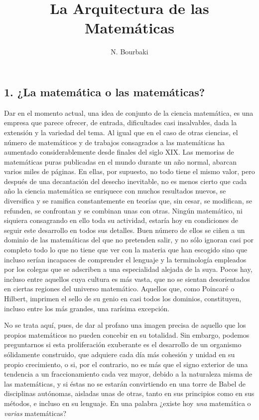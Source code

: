 \documentclass[a4paper, 12pt, draft]{article}
\title{La Arquitectura de las Matemáticas}
\author{N. Bourbaki}
\date{}
\begin{document}
\begin{tcolorbox}[colback=blue!5!white,colframe=blue!75!black]

\vspace{-1.8cm}
\textbf \maketitle

\end{tcolorbox}

\bigskip


\subsection*{1. ¿La matemática o las matemáticas?} 

Dar en el momento actual, una idea de conjunto de la ciencia matemática, es una empresa que parece ofrecer, de entrada, dificultades casi insalvables, dada la extensión y la variedad del tema. Al igual que en el caso de otras ciencias, el número de matemáticos y de trabajos consagrados a las matemáticas ha aumentado considerablemente desde finales del siglo XIX. Las memorias de matemáticas puras publicadas en el mundo durante un año normal, abarcan varios miles de páginas. En ellas, por supuesto, no todo tiene el mismo valor, pero después de una decantación del desecho inevitable, no es menos cierto que cada año la ciencia matemática se enriquece con muchos resultados nuevos, se diversifica y se ramifica constantemente en teorías que, sin cesar, se modifican, se refunden, se confrontan y se combinan unas con otras. Ningún matemático, ni siquiera consagrando en ello toda su actividad, estaría hoy en condiciones de seguir este desarrollo en todos sus detalles. Buen número de ellos se ciñen a un dominio de las matemáticas del que no pretenden salir, y no sólo ignoran casi por completo todo lo que no tiene que ver con la materia que han escogido sino que incluso serían incapaces de comprender el lenguaje y la terminología empleados por los colegas que se adscriben a una especialidad alejada de la suya. Pocos hay, incluso entre aquellos cuya cultura es más vasta, que no se sientan desorientados en ciertas regiones del universo matemático. Aquellos que, como Poincaré o Hilbert, imprimen el sello de su genio en casi todos los dominios, constituyen, incluso entre los más grandes, una rarísima excepción.

No se trata aquí, pues, de dar al profano una imagen precisa de aquello que los propios matemáticos no pueden concebir en su totalidad. Sin embargo, podemos preguntarnos si esta proliferación exuberante es el desarrollo de un organismo sólidamente construido, que adquiere cada día más cohesión y unidad en su propio crecimiento, o si, por el contrario, no es más que el signo exterior de una tendencia a un fraccionamiento cada vez mayor, debido a la naturaleza misma de las matemáticas, y si éstas no se estarán convirtiendo en una torre de Babel de disciplinas autónomas, aisladas unas de otras, tanto en sus principios como en sus métodos, e incluso en su lenguaje. En una palabra ¿existe hoy \textit{una} matemática o \textit{varias} matemáticas?
\end{document}
